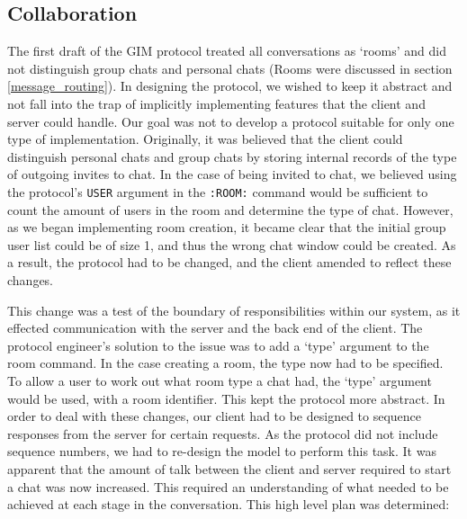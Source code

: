 \subsection{Collaboration}
\label{collab}

The first draft of the GIM protocol treated all conversations as `rooms' and did not distinguish group chats and personal chats (Rooms were discussed in section \ref{message_routing}). In designing the protocol, we wished to keep it abstract and not fall into the trap of implicitly implementing features that the client and server could handle. Our goal was not to develop a protocol suitable for only one type of implementation. Originally, it was believed that the client could distinguish personal chats and group chats by storing internal records of the type of outgoing invites to chat. In the case of being invited to chat, we believed using the protocol's \texttt{USER} argument in the \texttt{:ROOM:} command would be sufficient to count the amount of users in the room and determine the type of chat. However, as we began implementing room creation, it became clear that the initial group user list could be of size 1, and thus the wrong chat window could be created. As a result, the protocol had to be changed, and the client amended to reflect these changes. 

This change was a test of the boundary of responsibilities within our system, as it effected communication with the server and the back end of the client. The protocol engineer's solution to the issue was to add a `type' argument to the room command. In the case creating a room, the type now had to be specified. To allow a user to work out what room type a chat had, the `type' argument would be used, with a room identifier. This kept the protocol more abstract. In order to deal with these changes, our client had to be designed to sequence responses from the server for certain requests. As the protocol did not include sequence numbers, we had to re-design the model to perform this task. It was apparent that the amount of talk between the client and server required to start a chat was now increased. This required an understanding of what needed to be achieved at each stage in the conversation. This high level plan was determined:

